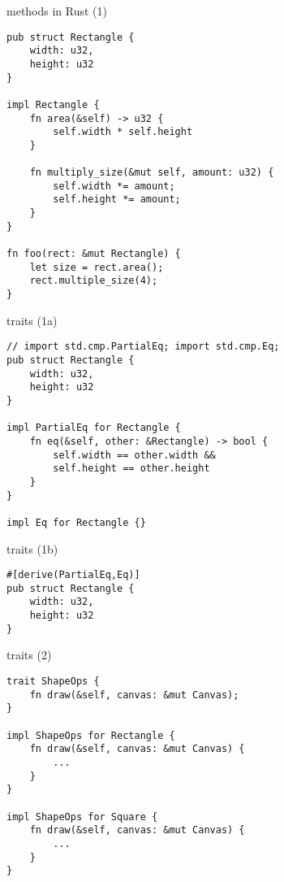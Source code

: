 \usetikzlibrary{positioning,shapes.callouts}
\begin{frame}[fragile,label=rustObjs]{methods in Rust (1)}
\begin{verbatim}
pub struct Rectangle {
    width: u32,
    height: u32
}

impl Rectangle {
    fn area(&self) -> u32 {
        self.width * self.height
    }

    fn multiply_size(&mut self, amount: u32) {
        self.width *= amount;
        self.height *= amount;
    }
}

fn foo(rect: &mut Rectangle) {
    let size = rect.area();
    rect.multiple_size(4);
}
\end{verbatim}
\end{frame}

\begin{frame}[fragile,label=rustTrait1a]{traits (1a)}
\begin{verbatim}
// import std.cmp.PartialEq; import std.cmp.Eq;
pub struct Rectangle {
    width: u32,
    height: u32
}

impl PartialEq for Rectangle {
    fn eq(&self, other: &Rectangle) -> bool {
        self.width == other.width &&
        self.height == other.height
    }
}

impl Eq for Rectangle {}
\end{verbatim}
\end{frame}

\begin{frame}[fragile,label=rustTrait1b]{traits (1b)}
\begin{verbatim}
#[derive(PartialEq,Eq)]
pub struct Rectangle {
    width: u32,
    height: u32
}
\end{verbatim}
\end{frame}


\begin{frame}[fragile,label=rustTrait2]{traits (2)}
\begin{verbatim}
trait ShapeOps {
    fn draw(&self, canvas: &mut Canvas);
}

impl ShapeOps for Rectangle {
    fn draw(&self, canvas: &mut Canvas) {
        ...
    }
}

impl ShapeOps for Square {
    fn draw(&self, canvas: &mut Canvas) {
        ...
    }
}
\end{verbatim}
\end{frame}
